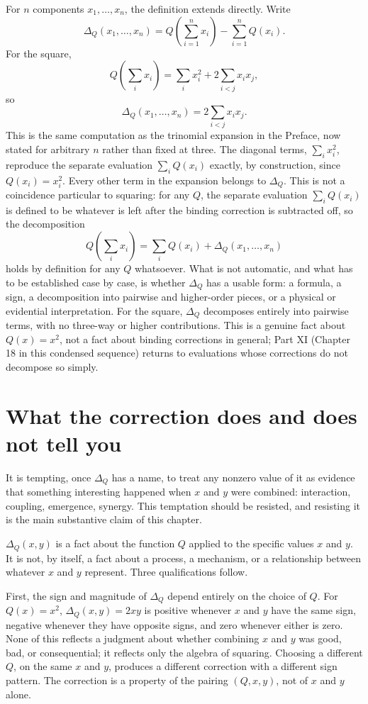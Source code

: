 \documentclass[11pt]{book}
\begin{document}
For $n$ components $x_1,\ldots,x_n$, the definition extends directly. Write
\[
\Delta_Q(x_1,\ldots,x_n) = Q\!\left(\sum_{i=1}^n x_i\right) - \sum_{i=1}^n Q(x_i).
\]
For the square,
\[
Q\!\left(\sum_i x_i\right) = \sum_i x_i^2 + 2\sum_{i<j}x_ix_j,
\]
so
\[
\Delta_Q(x_1,\ldots,x_n) = 2\sum_{i<j}x_ix_j.
\]
This is the same computation as the trinomial expansion in the Preface, now stated for arbitrary $n$ rather than fixed at three. The diagonal terms, $\sum_i x_i^2$, reproduce the separate evaluation $\sum_i Q(x_i)$ exactly, by construction, since $Q(x_i)=x_i^2$. Every other term in the expansion belongs to $\Delta_Q$. This is not a coincidence particular to squaring: for any $Q$, the separate evaluation $\sum_i Q(x_i)$ is defined to be whatever is left after the binding correction is subtracted off, so the decomposition
\[
Q\!\left(\sum_i x_i\right) = \sum_i Q(x_i) + \Delta_Q(x_1,\ldots,x_n)
\]
holds by definition for any $Q$ whatsoever. What is not automatic, and what has to be established case by case, is whether $\Delta_Q$ has a usable form: a formula, a sign, a decomposition into pairwise and higher-order pieces, or a physical or evidential interpretation. For the square, $\Delta_Q$ decomposes entirely into pairwise terms, with no three-way or higher contributions. This is a genuine fact about $Q(x)=x^2$, not a fact about binding corrections in general; Part XI (Chapter 18 in this condensed sequence) returns to evaluations whose corrections do not decompose so simply.

\section{What the correction does and does not tell you}

It is tempting, once $\Delta_Q$ has a name, to treat any nonzero value of it as evidence that something interesting happened when $x$ and $y$ were combined: interaction, coupling, emergence, synergy. This temptation should be resisted, and resisting it is the main substantive claim of this chapter.

$\Delta_Q(x,y)$ is a fact about the function $Q$ applied to the specific values $x$ and $y$. It is not, by itself, a fact about a process, a mechanism, or a relationship between whatever $x$ and $y$ represent. Three qualifications follow.

First, the sign and magnitude of $\Delta_Q$ depend entirely on the choice of $Q$. For $Q(x)=x^2$, $\Delta_Q(x,y)=2xy$ is positive whenever $x$ and $y$ have the same sign, negative whenever they have opposite signs, and zero whenever either is zero. None of this reflects a judgment about whether combining $x$ and $y$ was good, bad, or consequential; it reflects only the algebra of squaring. Choosing a different $Q$, on the same $x$ and $y$, produces a different correction with a different sign pattern. The correction is a property of the pairing $(Q,x,y)$, not of $x$ and $y$ alone.
\end{document}
